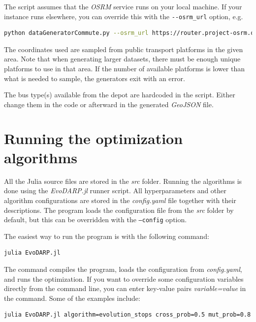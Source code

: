 The script assumes that the \textit{OSRM} service runs on your local machine. If your instance runs elsewhere, you can override this with the \texttt{-{}-osrm\_url} option, e.g.

\begin{lstlisting}[language=bash, breaklines=true]
    python dataGeneratorCommute.py --osrm_url https://router.project-osrm.org
\end{lstlisting}

The coordinates used are sampled from public transport platforms in the given area. Note that when generating larger datasets, there must be enough unique platforms to use in that area. If the number of available platforms is lower than what is needed to sample, the generators exit with an error.

The bus type(s) available from the depot are hardcoded in the script. Either change them in the code or afterward in the generated \textit{GeoJSON} file.

\section{Running the optimization algorithms}

All the Julia source files are stored in the \textit{src} folder. Running the algorithms is done using the \textit{EvoDARP.jl} runner script. All hyperparameters and other algorithm configurations are stored in the \textit{config.yaml} file together with their descriptions. The program loads the configuration file from the \textit{src} folder by default, but this can be overridden with the \texttt{--config} option.

The easiest way to run the program is with the following command:
\begin{lstlisting}[language=bash]
    julia EvoDARP.jl
\end{lstlisting}

The command compiles the program, loads the configuration from \textit{config.yaml}, and runs the optimization. If you want to override some configuration variables directly from the command line, you can enter key-value pairs \textit{variable=value} in the command. Some of the examples include:

\begin{lstlisting}[language=bash, breaklines=true]
    julia EvoDARP.jl algorithm=evolution_stops cross_prob=0.5 mut_prob=0.8 num_generations=20000
\end{lstlisting}


